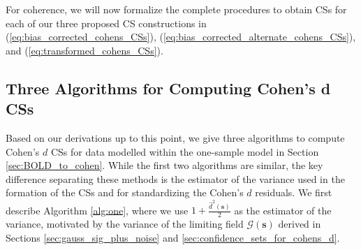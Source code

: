 For coherence, we will now formalize the complete procedures to obtain CSs for each of our three proposed CS constructions in (\ref{eq:bias_corrected_cohens_CSs}), (\ref{eq:bias_corrected_alternate_cohens_CSs}), and (\ref{eq:transformed_cohens_CSs}).

\subsection{Three Algorithms for Computing Cohen's d CSs}
Based on our derivations up to this point, we give three algorithms to compute Cohen's $d$ CSs for data modelled within the one-sample model in Section \ref{sec:BOLD_to_cohen}. While the first two algorithms are similar, the key difference separating these methods is the estimator of the variance used in the formation of the CSs and for standardizing the Cohen's $d$ residuals. We first describe Algorithm \ref{alg:one}, where we use $1 + \frac{\hat{d}^{2}(\bm{s})}{2}$ as the estimator of the variance, motivated by the variance of the limiting field $\mathcal{G}(\bm{s})$ derived in Sections \ref{sec:gauss_sig_plus_noise} and \ref{sec:confidence_sets_for_cohens_d}.

